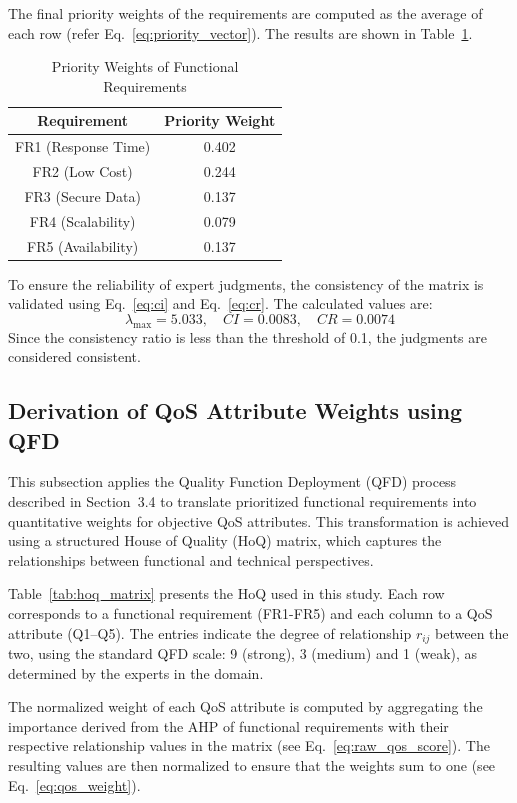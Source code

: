 \documentclass[twocolumn]{svjour3}
\begin{document}
The final priority weights of the requirements are computed as the average of each row (refer Eq.~\ref{eq:priority_vector}). The results are shown in Table~\ref{tab:ahp_weights}.

\begin{table}[H]
\centering
\caption{Priority Weights of Functional Requirements}
\label{tab:ahp_weights}
\begin{tabular}{|c|c|}
\hline
Requirement & Priority Weight \\
\hline
FR1 (Response Time) & 0.402 \\
FR2 (Low Cost)      & 0.244 \\
FR3 (Secure Data)   & 0.137 \\
FR4 (Scalability)   & 0.079 \\
FR5 (Availability)  & 0.137 \\
\hline
\end{tabular}
\end{table}

To ensure the reliability of expert judgments, the consistency of the matrix is validated using Eq.~\ref{eq:ci} and Eq.~\ref{eq:cr}. The calculated values are:
\[
\lambda_{\max} = 5.033, \quad CI = 0.0083, \quad CR = 0.0074
\]
Since the consistency ratio is less than the threshold of 0.1, the judgments are considered consistent.

\subsection{Derivation of QoS Attribute Weights using QFD}

This subsection applies the Quality Function Deployment (QFD) process described in Section~3.4 to translate prioritized functional requirements into quantitative weights for objective QoS attributes. This transformation is achieved using a structured House of Quality (HoQ) matrix, which captures the relationships between functional and technical perspectives.

Table~\ref{tab:hoq_matrix} presents the HoQ used in this study. Each row corresponds to a functional requirement (FR1-FR5) and each column to a QoS attribute (Q1–Q5). The entries indicate the degree of relationship $r_{ij}$ between the two, using the standard QFD scale: 9 (strong), 3 (medium) and 1 (weak), as determined by the experts in the domain.

The normalized weight of each QoS attribute is computed by aggregating the importance derived from the AHP of functional requirements with their respective relationship values in the matrix (see Eq.~\ref{eq:raw_qos_score}). The resulting values are then normalized to ensure that the weights sum to one (see Eq.~\ref{eq:qos_weight}).
\end{document}

